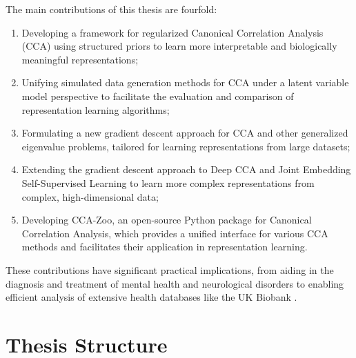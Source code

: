 The main contributions of this thesis are fourfold:
\begin{enumerate}
\item Developing a framework for regularized Canonical Correlation Analysis (CCA) using structured priors to learn more interpretable and biologically meaningful representations;
\item Unifying simulated data generation methods for CCA under a latent variable model perspective to facilitate the evaluation and comparison of representation learning algorithms;
\item Formulating a new gradient descent approach for CCA and other generalized eigenvalue problems, tailored for learning representations from large datasets;
\item Extending the gradient descent approach to Deep CCA and Joint Embedding Self-Supervised Learning to learn more complex representations from complex, high-dimensional data;
\item Developing CCA-Zoo, an open-source Python package for Canonical Correlation Analysis, which provides a unified interface for various CCA methods and facilitates their application in representation learning.
\end{enumerate}
These contributions have significant practical implications, from aiding in the diagnosis and treatment of mental health and neurological disorders to enabling efficient analysis of extensive health databases like the UK Biobank \citep{biobank2014uk}.

\section*{Thesis Structure}

